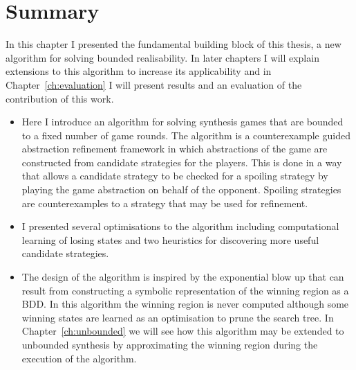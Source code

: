 \section{Summary}

In this chapter I presented the fundamental building block of this thesis, a new algorithm for solving bounded realisability. In later chapters I will explain extensions to this algorithm to increase its applicability and in Chapter~\ref{ch:evaluation} I will present results and an evaluation of the contribution of this work.

\begin{itemize}
    \item Here I introduce an algorithm for solving synthesis games that are bounded to a fixed number of game rounds. The algorithm is a counterexample guided abstraction refinement framework in which abstractions of the game are constructed from candidate strategies for the players. This is done in a way that allows a candidate strategy to be checked for a spoiling strategy by playing the game abstraction on behalf of the opponent. Spoiling strategies are counterexamples to a strategy that may be used for refinement.

    \item I presented several optimisations to the algorithm including computational learning of losing states and two heuristics for discovering more useful candidate strategies.

    \item The design of the algorithm is inspired by the exponential blow up that can result from constructing a symbolic representation of the winning region as a BDD. In this algorithm the winning region is never computed although some winning states are learned as an optimisation to prune the search tree. In Chapter~\ref{ch:unbounded} we will see how this algorithm may be extended to unbounded synthesis by approximating the winning region during the execution of the algorithm.


\end{itemize}
